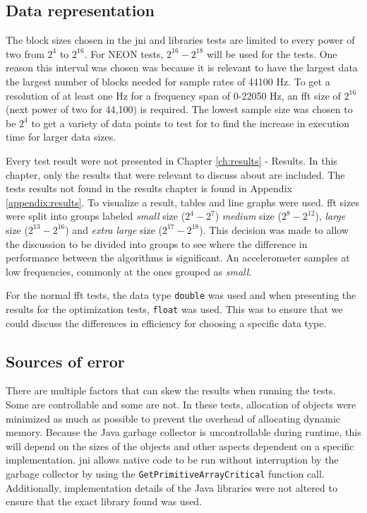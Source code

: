 \subsection{Data representation}
The block sizes chosen in the \gls{jni} and libraries tests are limited to every power of two from $2^4$ to $2^{16}$. For NEON tests, $2^{16} - 2^{18}$ will be used for the tests. One reason this interval was chosen was because it is relevant to have the largest data the largest number of blocks needed for sample rates of 44100 Hz. To get a resolution of at least one Hz for a frequency span of 0-22050 Hz, an \gls{fft} size of $2^{16}$ (next power of two for 44,100) is required. The lowest sample size was chosen to be $2^{4}$ to get a variety of data points to test for to find the increase in execution time for larger data sizes.

Every test result were not presented in Chapter \ref{ch:results} - Results. In this chapter, only the results that were relevant to discuss about are included. The tests results not found in the results chapter is found in Appendix \ref{appendix:results}. To visualize a result, tables and line graphs were used. \gls{fft} sizes were split into groups labeled \emph{small} size ($2^{4} - 2^{7}$) \emph{medium} size ($2^{8} - 2^{12}$), \emph{large} size ($2^{13} - 2^{16}$) and \emph{extra large} size ($2^{17} - 2^{18}$). This decision was made to allow the discussion to be divided into groups to see where the difference in performance between the algorithms is significant. An accelerometer samples at low frequencies, commonly at the ones grouped as \emph{small}.

For the normal \gls{fft} tests, the data type \texttt{double} was used and when presenting the results for the optimization tests, \texttt{float} was used. This was to ensure that we could discuss the differences in efficiency for choosing a specific data type.

\subsection{Sources of error}
There are multiple factors that can skew the results when running the tests. Some are controllable and some are not. In these tests, allocation of objects were minimized as much as possible to prevent the overhead of allocating dynamic memory. Because the Java garbage collector is uncontrollable during runtime, this will depend on the sizes of the objects and other aspects dependent on a specific implementation. \gls{jni} allows native code to be run without interruption by the garbage collector by using the \texttt{GetPrimitiveArrayCritical} function call. Additionally, implementation details of the Java libraries were not altered to ensure that the exact library found was used.

